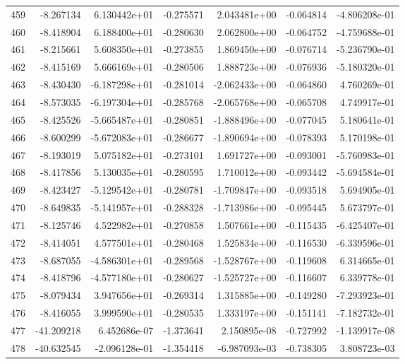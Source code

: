\begin{tabular}{rrrrrrr}
 459 &  -8.267134 &  6.130442e+01 & -0.275571 &  2.043481e+00 &   -0.064814 & -4.806208e-01 \\
 460 &  -8.418904 &  6.188400e+01 & -0.280630 &  2.062800e+00 &   -0.064752 & -4.759688e-01 \\
 461 &  -8.215661 &  5.608350e+01 & -0.273855 &  1.869450e+00 &   -0.076714 & -5.236790e-01 \\
 462 &  -8.415169 &  5.666169e+01 & -0.280506 &  1.888723e+00 &   -0.076936 & -5.180320e-01 \\
 463 &  -8.430430 & -6.187298e+01 & -0.281014 & -2.062433e+00 &   -0.064860 &  4.760269e-01 \\
 464 &  -8.573035 & -6.197304e+01 & -0.285768 & -2.065768e+00 &   -0.065708 &  4.749917e-01 \\
 465 &  -8.425526 & -5.665487e+01 & -0.280851 & -1.888496e+00 &   -0.077045 &  5.180641e-01 \\
 466 &  -8.600299 & -5.672083e+01 & -0.286677 & -1.890694e+00 &   -0.078393 &  5.170198e-01 \\
 467 &  -8.193019 &  5.075182e+01 & -0.273101 &  1.691727e+00 &   -0.093001 & -5.760983e-01 \\
 468 &  -8.417856 &  5.130035e+01 & -0.280595 &  1.710012e+00 &   -0.093442 & -5.694584e-01 \\
 469 &  -8.423427 & -5.129542e+01 & -0.280781 & -1.709847e+00 &   -0.093518 &  5.694905e-01 \\
 470 &  -8.649835 & -5.141957e+01 & -0.288328 & -1.713986e+00 &   -0.095445 &  5.673797e-01 \\
 471 &  -8.125746 &  4.522982e+01 & -0.270858 &  1.507661e+00 &   -0.115435 & -6.425407e-01 \\
 472 &  -8.414051 &  4.577501e+01 & -0.280468 &  1.525834e+00 &   -0.116530 & -6.339596e-01 \\
 473 &  -8.687055 & -4.586301e+01 & -0.289568 & -1.528767e+00 &   -0.119608 &  6.314665e-01 \\
 474 &  -8.418796 & -4.577180e+01 & -0.280627 & -1.525727e+00 &   -0.116607 &  6.339778e-01 \\
 475 &  -8.079434 &  3.947656e+01 & -0.269314 &  1.315885e+00 &   -0.149280 & -7.293923e-01 \\
 476 &  -8.416055 &  3.999590e+01 & -0.280535 &  1.333197e+00 &   -0.151141 & -7.182732e-01 \\
 477 & -41.209218 &  6.452686e-07 & -1.373641 &  2.150895e-08 &   -0.727992 & -1.139917e-08 \\
 478 & -40.632545 & -2.096128e-01 & -1.354418 & -6.987093e-03 &   -0.738305 &  3.808723e-03 \\

\end{tabular}
